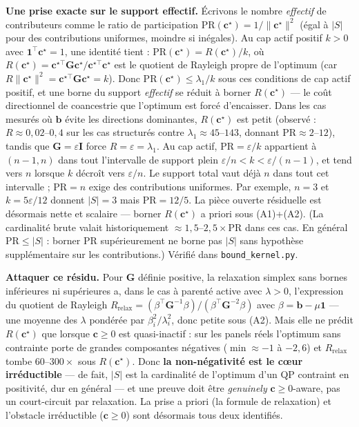 \documentclass[11pt]{article}
\theoremstyle{plain}
\newcommand{\tp}{^{\top}}
\newcommand{\bc}{\mathbf{c}}
\newcommand{\bb}{\mathbf{b}}
\newcommand{\bG}{\mathbf{G}}
\newcommand{\bone}{\mathbf{1}}
\begin{document}
\textbf{Une prise exacte sur le support effectif.} Écrivons le nombre \emph{effectif} de contributeurs
comme le ratio de participation $\mathrm{PR}(\bc^\star) = 1/\lVert\bc^\star\rVert^2$ (égal à $|S|$ pour
des contributions uniformes, moindre si inégales). Au cap actif positif $k>0$ avec $\bone\tp\bc^\star = 1$, une
identité tient : $\mathrm{PR}(\bc^\star) = R(\bc^\star)/k$, où
$R(\bc^\star) = \bc^{\star\top}\bG\bc^\star / \bc^{\star\top}\bc^\star$ est le quotient de Rayleigh
propre de l'optimum (car $R\lVert\bc^\star\rVert^2 = \bc^{\star\top}\bG\bc^\star = k$). Donc
$\mathrm{PR}(\bc^\star) \le \lambda_1/k$ sous ces conditions de cap actif positif, et une borne du support \emph{effectif} se réduit à borner $R(\bc^\star)$ --- le coût directionnel de coancestrie que l'optimum est forcé d'encaisser.
Dans les cas mesurés où $\bb$ évite les directions dominantes, $R(\bc^\star)$ est petit (observé : $R \approx 0{,}02$--$0{,}4$ sur les cas
structurés contre $\lambda_1 \approx 45$--$143$, donnant $\mathrm{PR} \approx 2$--$12$), tandis que
$\bG = \varepsilon\mathbf{I}$ force $R = \varepsilon = \lambda_1$. Au cap actif,
$\mathrm{PR}=\varepsilon/k$ appartient à $(n-1,n)$ dans tout l'intervalle de support plein
$\varepsilon/n<k<\varepsilon/(n-1)$, et tend vers $n$ lorsque $k$ décroît vers $\varepsilon/n$.
Le support total vaut déjà $n$ dans tout cet intervalle ; $\mathrm{PR}=n$ exige des contributions uniformes.
Par exemple, $n=3$ et $k=5\varepsilon/12$ donnent $|S|=3$ mais $\mathrm{PR}=12/5$.
La pièce ouverte
résiduelle est désormais nette et scalaire --- borner $R(\bc^\star)$ a priori sous (A1)+(A2). (La cardinalité brute valait historiquement $\approx1{,}5$--$2{,}5\times\mathrm{PR}$ dans ces cas. En général $\mathrm{PR}\le|S|$ : borner PR supérieurement ne borne pas $|S|$ sans hypothèse supplémentaire sur les contributions.) Vérifié dans \texttt{bound\_kernel.py}.

\textbf{Attaquer ce résidu.} Pour $\bG$ définie positive, la relaxation simplex sans bornes inférieures ni supérieures a, dans le cas à parenté active avec $\lambda>0$, l'expression du quotient de Rayleigh
$R_{\mathrm{relax}} = (\beta\tp\bG^{-1}\beta)/(\beta\tp\bG^{-2}\beta)$ avec $\beta = \bb - \mu\bone$ ---
une moyenne des $\lambda$ pondérée par $\beta_i^2/\lambda_i^2$, donc petite sous (A2). Mais elle ne
prédit $R(\bc^\star)$ que lorsque $\bc \ge 0$ est quasi-inactif : sur les panels réels l'optimum sans
contrainte porte de grandes composantes négatives ($\min \approx -1$ à $-2{,}6$) et
$R_{\mathrm{relax}}$ tombe $60$--$300\times$ sous $R(\bc^\star)$. Donc \textbf{la non-négativité est le
cœur irréductible} --- de fait, $|S|$ est la cardinalité de l'optimum d'un QP contraint en positivité,
dur en général --- et une preuve doit être \emph{genuinely} $\bc \ge 0$-aware, pas un court-circuit par
relaxation. La prise a priori (la formule de relaxation) et l'obstacle irréductible ($\bc \ge 0$) sont
désormais tous deux identifiés.
\end{document}
